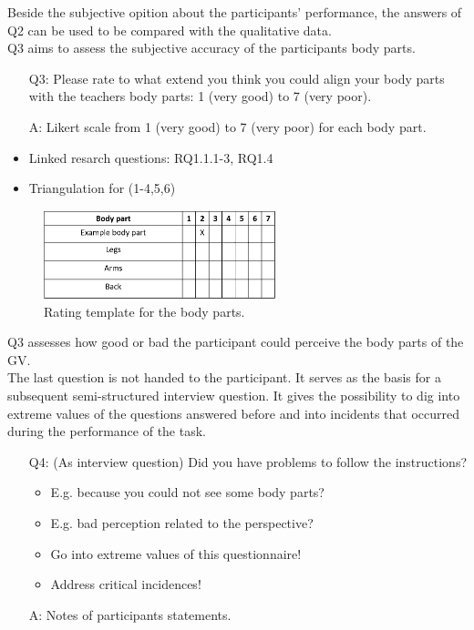 Beside the subjective opition about the participants' performance, the answers of Q2 can be used to be compared with the qualitative data.\\
Q3 aims to assess the subjective accuracy of the participants body parts.
\begin{itemize}
	\item[Q3:] Please rate to what extend you think you could align your body parts with the teachers body parts: 1 (very good) to 7 (very poor). 
	\item[A:] Likert scale from 1 (very good) to 7 (very poor) for each body part.
	\item Linked resarch questions: RQ1.1.1-3, RQ1.4
	\item Triangulation for (1-4,5,6)
\end{itemize} 
\begin{figure}[H]
	\centering
	\includegraphics[width=0.6\textwidth]{figures/body-parts-acc.png}
	\caption[Rating template: body parts]{Rating template for the body parts.}
	\label{fig:bodypartsacc}
\end{figure}
Q3 assesses how good or bad the participant could perceive the body parts of the GV.\\
The last question is not handed to the participant. It serves as the basis for a subsequent semi-structured interview question. It gives the possibility to dig into extreme values of the questions answered before and into incidents that occurred during the performance of the task.
\begin{itemize}
	\item[Q4:] (As interview question) Did you have problems to follow the instructions? 
	\begin{itemize}
		\item E.g. because you could not see some body parts?
		\item E.g. bad perception related to the perspective?
		\item Go into extreme values of this questionnaire! 
		\item Address critical incidences!
	\end{itemize}
	\item[A:] Notes of participants statements.
\end{itemize}

